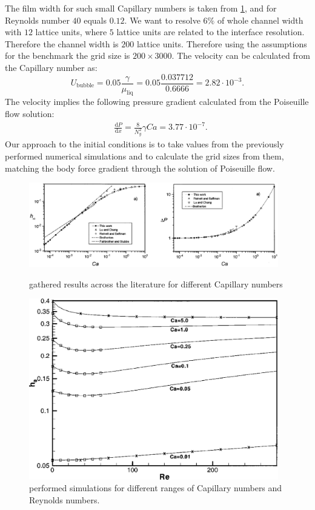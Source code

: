 \documentclass{article}
\begin{document}
\begin{description}
  The film width for such small Capillary numbers is taken from
  \ref{fig:heil:planar}, and for Reynolds number $40$ equals $0.12$. We want to
  resolve $6\%$ of whole channel width with $12$ lattice units, where $5$
lattice units are related to the interface resolution.  Therefore the channel
  width is $200$ lattice units. Therefore using the assumptions for the benchmark 
the grid size is $200 \times 3000$. The velocity can be
calculated from the Capillary number as:
  \begin{equation}
  U_{\mathrm{bubble}}=0.05 \frac{\gamma}{\mu_{\mathrm{liq}}}=0.05 \frac{0.037712}{0.6666}=2.82\cdot
  10^{-3}.
  \end{equation}
  The velocity implies the following pressure gradient calculated from the
  Poiseuille flow solution:
  \begin{equation}
  \begin{aligned}
  &\frac{\mathrm{d}P}{\mathrm{d}x}=\frac{8}{N_y^2}\gamma Ca=3.77\cdot10^{-7}.
  \end{aligned}
  \end{equation}
  Our approach to the initial conditions is  to take values from the previously performed
numerical simulations and to calculate the grid sizes from them, matching the
body force gradient through the solution of Poiseuille flow.

\end{description}
\begin{figure}
\includegraphics[width=0.97\textwidth]{Figures/giavedoni_planar.eps}
\caption{\citet{giavedoni-numerical} gathered results across the
literature for different Capillary numbers \label{fig:giavedoni:planar}}
\includegraphics[width=0.97\textwidth]{Figures/heil-planar.eps}
\caption{\citet{heil-bretherton} performed simulations for different ranges of
Capillary numbers and Reynolds numbers. \label{fig:heil:planar}}
\end{figure}
\end{document}
